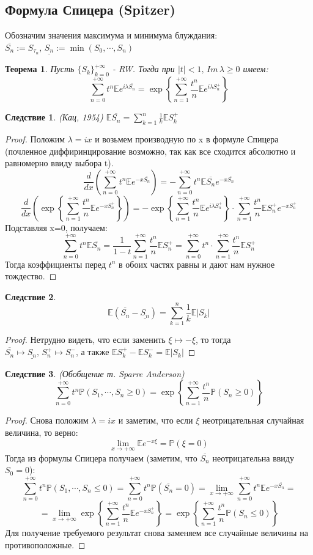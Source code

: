 \documentclass[12pt,a4paper]{article} %
\newtheorem{theorem}{Теорема}
\newtheorem{consequence}{Следствие}
\newcommand{\E}{\mathbb{E}}
\newcommand{\PR}{\mathbb{P}}
\begin{document}
	\subsection{Формула Спицера (Spitzer)}
	Обозначим значения максимума и минимума блуждания: $\overline{S_n}:=S_{\tau_n},\,\underline{S_n}:=\min(S_0,\cdots,S_n)$
	\begin{theorem}
		Пусть $\{S_k\}_{k=0}^{+\infty}$ - RW. Тогда при $|t|<1,\,Im\,\lambda\geq0$ имеем:
		$$\sum_{n=0}^{+\infty}t^n\E e^{i\lambda\overline{S_n}}=\exp\left\{\sum_{n=1}^{+\infty}\frac{t^n}{n}\E e^{i\lambda S_n^{+}}\right\}$$
	\end{theorem}
	\begin{consequence}
		(Кац, 1954) $\E\overline{S_n}=\displaystyle\sum_{k=1}^n\frac{1}{k}\E S_k^{+}$
	\end{consequence}
	\begin{proof}
		Положим $\lambda=ix$ и возьмем производную по x в формуле Спицера (почленное диффиринцирование возможно, так как все сходится абсолютно и равномерно ввиду выбора t).
		$$\frac{d}{dx}\left(\sum_{n=0}^{+\infty}t^n\E e^{-x\overline{S_n}}\right)=-\sum_{n=0}^{+\infty}t^n\E\overline{S_n}e^{-x\overline{S_n}}$$
		$$\frac{d}{dx}\left(\exp\left\{\sum_{n=1}^{+\infty}\frac{t^n}{n}\E e^{-x S_n^{+}}\right\}\right)=-\exp\left\{\sum_{n=1}^{+\infty}\frac{t^n}{n}\E e^{i\lambda S_n^{+}}\right\}\cdot\sum_{n=1}^{+\infty}\frac{t^n}{n}\E S_n^{+}e^{-x S_n^{+}}$$
		Подставляя x=0, получаем:
		$$\sum_{n=0}^{+\infty}t^n\E\overline{S_n}=\frac{1}{1-t}\sum_{n=1}^{+\infty}\frac{t^n}{n}\E S_n^{+}=\sum_{n=0}^{+\infty}t^n\cdot\sum_{n=1}^{+\infty}\frac{t^n}{n}\E S_n^{+}$$
		Тогда коэффициенты перед $t^n$ в обоих частях равны и дают нам нужное тождество.
	\end{proof}
	\begin{consequence}
		$$\E(\overline{S_n}-\underline{S_n})=\sum_{k=1}^n\frac{1}{k}\E|S_k|$$
	\end{consequence}
	\begin{proof}
		Нетрудно видеть, что если заменить $\xi\mapsto-\xi$, то тогда \\$\overline{S_n}\mapsto\underline{S_n},\,S_n^{+}\mapsto S_n^{-}$, а также $\E S_k^{+}-\E S_k^{-}=\E|S_k|$
	\end{proof}
	\begin{consequence}
		(Обобщение т. Sparre Anderson)
		$$\sum_{n=0}^{+\infty}t^n\PR(S_1,\cdots,S_n\geq0)=\exp\left\{\sum_{n=1}^{+\infty}\frac{t^n}{n}\PR(S_n\geq0)\right\}$$
	\end{consequence}
	\begin{proof}
		Снова положим $\lambda=ix$ и заметим, что если $\xi$ неотрицательная случайная величина, то верно:
		$$\lim\limits_{x\rightarrow+\infty}\E e^{-x\xi}=\PR(\xi=0)$$
		Тогда из формулы Спицера получаем (заметим, что $\overline{S_n}$ неотрицательна ввиду $S_0=0$):
		$$\sum_{n=0}^{+\infty}t^n\PR(S_1,\cdots,S_n\leq0)=\sum_{n=0}^{+\infty}t^n\PR(\overline{S_n}=0)=\lim\limits_{x\rightarrow+\infty}\sum_{n=0}^{+\infty}t^n\E e^{-x\overline{S_n}}=$$
		$$=\lim\limits_{x\rightarrow+\infty}\exp\left\{\sum_{n=1}^{+\infty}\frac{t^n}{n}\E e^{-x S_n^{+}}\right\}=\exp\left\{\sum_{n=1}^{+\infty}\frac{t^n}{n}\PR(S_n\leq0)\right\}$$
		Для получение требуемого результат снова заменяем все случайные величины на противоположные.
	\end{proof}
\end{document}
